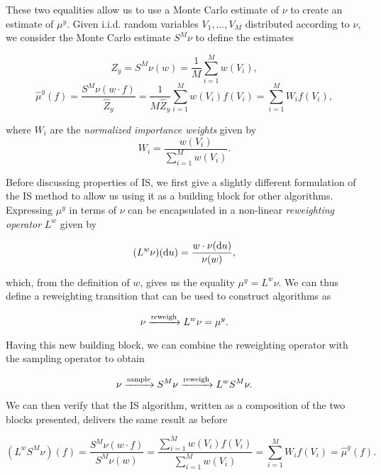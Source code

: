 These two equalities allow us to use a Monte Carlo estimate of $\nu$ to create an estimate of $\mu^y$. Given i.i.d. random variables $V_1, \ldots, V_M$ distributed according to $\nu$, we consider the Monte Carlo estimate $S^M\nu$ to define the estimates

\begin{equation*}
  \hat Z_y = S^M\nu(w) = \frac1M\sum_{i=1}^M{w(V_i)},
\end{equation*}
\begin{equation*}
  \hat\mu^y(f) = \frac{S^M\nu(w \cdot f)}{\hat Z_y} = \frac1{M\hat Z_y}\sum_{i=1}^M{w(V_i)f(V_i)}
               = \sum_{i=1}^MW_if(V_i),
\end{equation*}

where $W_i$ are the \textit{normalized importance weights} given by
\begin{equation*}
  W_i = \frac{w(V_i)}{\sum_{i=1}^M{w(V_i)}}.
\end{equation*}

Before discussing properties of IS, we first give a slightly different formulation of the IS method to allow us using it as a building block for other algorithms. Expressing $\mu^y$ in terms of $\nu$ can be encapsulated in a non-linear \textit{reweighting operator} $L^w$ given by

\begin{equation*}
  (L^w\nu)(\text{d} u) = \frac{w \cdot \nu(\text{d} u)}{\nu(w)},
\end{equation*}

which, from the definition of $w$, gives us the equality $\mu^y = L^w\nu$. We can thus define a reweighting transition that can be used to construct algorithms as

\begin{equation*}
  \nu \xrightarrow{\text{reweigh}} L^w\nu = \mu^y.
\end{equation*}

Having this new building block, we can combine the reweighting operator with the sampling operator to obtain

\begin{equation*}
  \nu \xrightarrow{\text{sample}} S^M\nu \xrightarrow{\text{reweigh}} L^wS^M\nu.
\end{equation*}

We can then verify that the IS algorithm, written as a composition of the two blocks presented, delivers the same result as before

\begin{equation*}
  (L^wS^M\nu)(f)
               = \frac{S^M\nu(w \cdot f)}{S^M\nu(w)}
               = \frac{\sum_{i=1}^Mw(V_i)f(V_i)}{\sum_{i=1}^Mw(V_i)}
               = \sum_{i=1}^MW_if(V_i) = \hat\mu^y(f).
\end{equation*}

